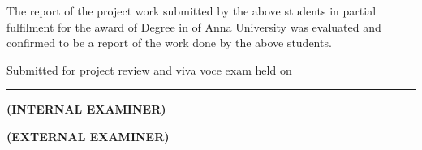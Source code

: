 \vspace{0.5cm}

\sloppy
\noindent
The report of the project work submitted by the above students in partial
fulfilment for the award of \DegreeName{} Degree in \DepartmentName{}
of Anna University was evaluated and confirmed to be a report of the work
done by the above students.
\fussy

\vspace{0.5cm}

\noindent
Submitted for project review and viva voce exam held on \rule{3cm}{0.4pt}

\vspace{1.5cm}

\noindent
\begin{minipage}[t]{0.45\textwidth}
  \textbf{(INTERNAL EXAMINER)}
\end{minipage}%
\hfill
\begin{minipage}[t]{0.45\textwidth}
  \textbf{(EXTERNAL EXAMINER)}
\end{minipage}
